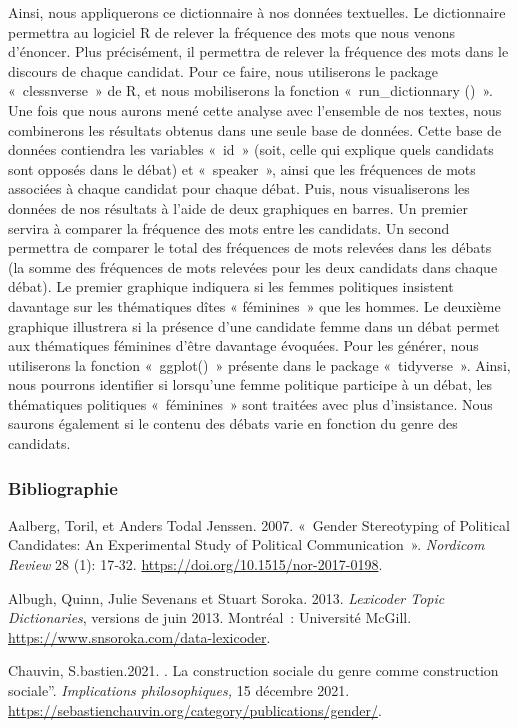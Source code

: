 \documentclass[
  letterpaper,
  DIV=11,
  numbers=noendperiod]{scrartcl}
\begin{document}
Ainsi, nous appliquerons ce dictionnaire à nos données textuelles. Le
dictionnaire permettra au logiciel R de relever la fréquence des mots
que nous venons d'énoncer. Plus précisément, il permettra de relever la
fréquence des mots dans le discours de chaque candidat. Pour ce faire,
nous utiliserons le package «~clessnverse~» de R, et nous mobiliserons
la fonction «~run\_dictionnary ()~». Une fois que nous aurons mené cette
analyse avec l'ensemble de nos textes, nous combinerons les résultats
obtenus dans une seule base de données. Cette base de données contiendra
les variables «~id~» (soit, celle qui explique quels candidats sont
opposés dans le débat) et «~speaker~», ainsi que les fréquences de mots
associées à chaque candidat pour chaque débat. Puis, nous visualiserons
les données de nos résultats à l'aide de deux graphiques en barres. Un
premier servira à comparer la fréquence des mots entre les candidats. Un
second permettra de comparer le total des fréquences de mots relevées
dans les débats (la somme des fréquences de mots relevées pour les deux
candidats dans chaque débat). Le premier graphique indiquera si les
femmes politiques insistent davantage sur les thématiques dîtes «
féminines~» que les hommes. Le deuxième graphique illustrera si la
présence d'une candidate femme dans un débat permet aux thématiques
féminines d'être davantage évoquées. Pour les générer, nous utiliserons
la fonction «~ggplot()~» présente dans le package «~tidyverse~». Ainsi,
nous pourrons identifier si lorsqu'une femme politique participe à un
débat, les thématiques politiques «~féminines~» sont traitées avec plus
d'insistance. Nous saurons également si le contenu des débats varie en
fonction du genre des candidats.

\hypertarget{bibliographie}{%
\subsubsection{\texorpdfstring{\textbf{Bibliographie}}{Bibliographie}}\label{bibliographie}}

Aalberg, Toril, et Anders Todal Jenssen. 2007. «~Gender Stereotyping of
Political Candidates: An Experimental Study of Political
Communication~». \emph{Nordicom Review} 28 (1): 17‑32.
\url{https://doi.org/10.1515/nor-2017-0198}.

Albugh, Quinn, Julie Sevenans et Stuart Soroka. 2013. \emph{Lexicoder
Topic Dictionaries}, versions de juin 2013. Montréal~: Université
McGill. \url{https://www.snsoroka.com/data-lexicoder}.

Chauvin, S.bastien.2021. . La construction sociale du genre comme
construction sociale''. \emph{Implications philosophiques,} 15 décembre
2021. \url{https://sebastienchauvin.org/category/publications/gender/}.
\end{document}
